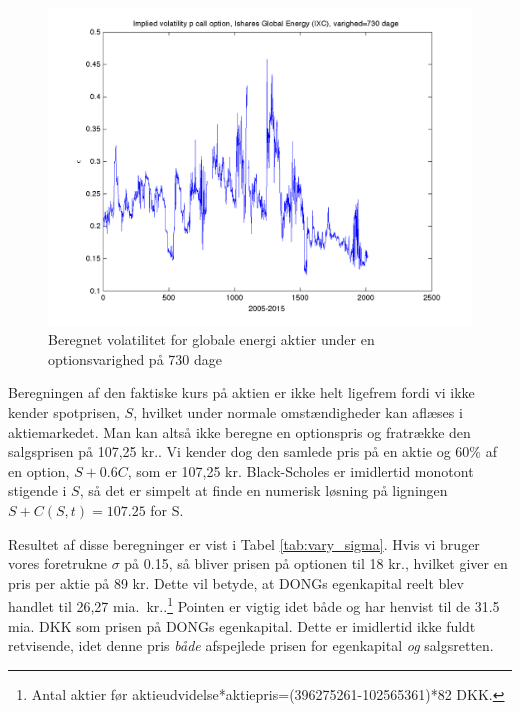 \documentclass{article}
\begin{document}
\begin{figure}
\includegraphics[scale=0.8]{../matlab/figs/implied_vol_730}
\caption{Beregnet volatilitet for globale energi aktier under en optionsvarighed på 730 dage}
\label{fig:option_vol_730}
\end{figure}

Beregningen af den faktiske kurs på aktien er ikke helt ligefrem fordi vi ikke kender spotprisen, $S$, hvilket under normale omstændigheder kan aflæses i aktiemarkedet. Man kan altså ikke  beregne en optionspris og fratrække den salgsprisen på 107,25 kr.. Vi kender dog den samlede pris på en aktie og 60\% af en option, $S + 0.6 C$, som er 107,25 kr. Black-Scholes er imidlertid monotont stigende i $S$, så det er simpelt at finde en numerisk løsning på ligningen $S + C(S, t) = 107.25$ for S.

Resultet af disse beregninger er vist i Tabel \ref{tab:vary_sigma}.  Hvis vi bruger vores foretrukne $\sigma$ på 0.15, så bliver prisen på optionen til 18 kr., hvilket giver en pris per aktie på 89 kr. Dette vil betyde, at DONGs egenkapital reelt blev handlet til 26,27 mia.\ kr..\footnote{Antal aktier før aktieudvidelse*aktiepris=(396275261-102565361)*82 DKK.}  Pointen er vigtig idet både \cite{FM2013a} og \cite{DONG2015} har henvist til de 31.5  mia. DKK som prisen på DONGs egenkapital. Dette er imidlertid ikke fuldt  retvisende, idet denne pris \emph{både} afspejlede prisen for egenkapital \emph{og} salgsretten. 
\end{document}
